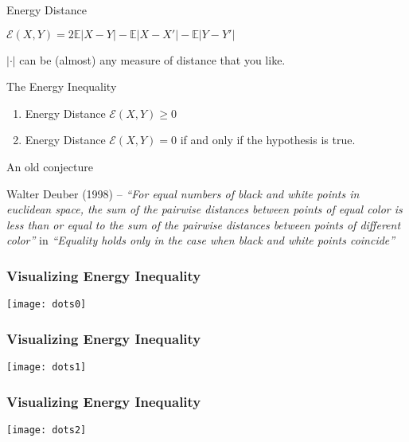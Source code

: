 \documentclass[presentation]{beamer}
\begin{document}
\begin{frame}
  \begin{block}{Energy Distance}
    \begin{center}
      $\mathcal{E}(X,Y) = 2\mathbb{E}|X - Y| - \mathbb{E}|X - X'| -
      \mathbb{E}|Y - Y'|$
    \end{center}
  \end{block}
  $|\cdot|$ can be (almost) any measure of distance that you like.
\end{frame}

\begin{frame}{The Energy Inequality}
  \begin{enumerate}
  \item Energy Distance $\mathcal{E}(X,Y) \geq 0$ 
  \item Energy Distance $\mathcal{E}(X,Y) = 0$ if and only if the
    hypothesis is true.
  \end{enumerate}
\end{frame}

\begin{frame}{An old conjecture}
  \begin{block}{Walter Deuber (1998) -- }
    \textit{``For equal numbers of black and white points in euclidean
      space, the sum of the pairwise distances between points of equal
      color is less than or equal to the sum of the pairwise distances
      between points of different color''}  in
    \textit{``Equality holds only in the case when black and white
      points coincide''}
  \end{block}
\end{frame}

\begin{frame}
  \frametitle{Visualizing Energy Inequality}
  \begin{center}
    \texttt{[image: dots0]}
  \end{center}
\end{frame}

\begin{frame}
  \frametitle{Visualizing Energy Inequality}
  \begin{center}
    \texttt{[image: dots1]}
  \end{center}
\end{frame}


\begin{frame}
  \frametitle{Visualizing Energy Inequality}
  \begin{center}
    \texttt{[image: dots2]}
  \end{center}
\end{frame}
\end{document}
